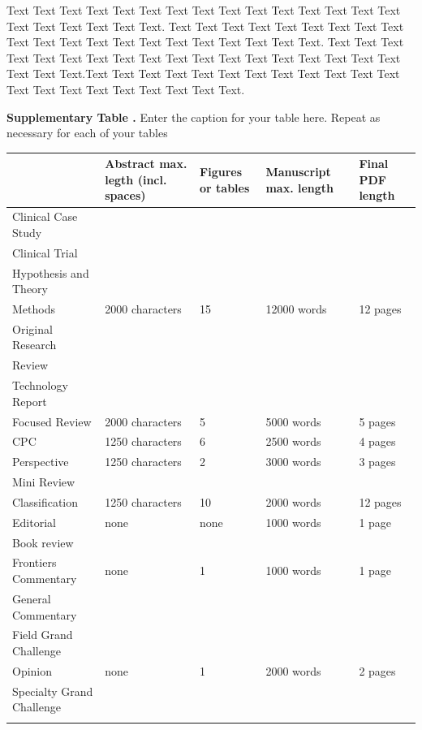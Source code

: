\documentclass{frontiers_suppmat} %
\begin{document}
Text Text Text Text Text Text  Text Text Text Text Text Text Text Text Text  Text Text Text Text Text Text. Text Text Text Text Text Text  Text Text Text Text Text Text Text Text Text  Text Text Text Text Text Text. Text Text Text Text Text Text  Text Text Text Text Text Text Text Text Text  Text Text Text Text Text Text.Text Text Text Text Text Text  Text Text Text Text Text Text Text Text Text  Text Text Text Text Text Text.

\begin{table}[!t]
\textbf{\label{Tab:01} Supplementary Table .}{ Enter the caption for your table here.  Repeat as  necessary for each of your tables }

\processtable{ }
{\begin{tabular}{lllll}\toprule
 & Abstract max. legth (incl. spaces) & Figures or tables & Manuscript max. length & Final PDF length\\\midrule
Clinical Case Study & & & &\\
Clinical Trial & & & &\\
Hypothesis and Theory & & & &\\
Methods & 2000 characters  & 15 & 12000 words & 12 pages\\
Original Research & & & &\\
Review & & & &\\
Technology Report & & & &\\
Focused Review & 2000 characters & 5 & 5000 words & 5 pages\\
CPC &  1250 characters& 6 & 2500 words & 4 pages\\
Perspective & 1250 characters & 2 & 3000 words & 3 pages\\
Mini Review & & & &\\
Classification & 1250 characters & 10 & 2000 words & 12 pages\\
Editorial & none & none & 1000 words & 1 page \\
Book review & & & &\\
Frontiers Commentary & none & 1 & 1000 words & 1 page\\
General Commentary & & & &\\
Field Grand Challenge & & & &\\
Opinion & none & 1 & 2000 words & 2 pages\\
Specialty Grand Challenge& & & &\\\botrule
\end{tabular}}{}
\end{table}
\end{document}
